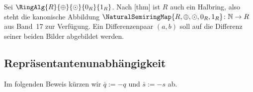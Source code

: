 \documentclass[main.tex]{subfiles}
\begin{document}
Sei \(\RingAlg{R}{\oplus}{\odot}{0_R}{1_R}\). Nach
[thm] ist \(R\) auch ein Halbring,
also steht die kanonische Abbildung
\(\NaturalSemiringMap{R,\oplus,\odot,0_R,1_R}\colon\mathbb N\to R\)
aus Band~17 zur Verfügung. Ein Differenzenpaar \((a,b)\) soll auf die
Differenz seiner beiden Bilder abgebildet werden.

\subsection{Repräsentantenunabhängigkeit}

Im folgenden Beweis kürzen wir
\(\bar q:=-q\) und \(\bar s:=-s\) ab.
\end{document}
